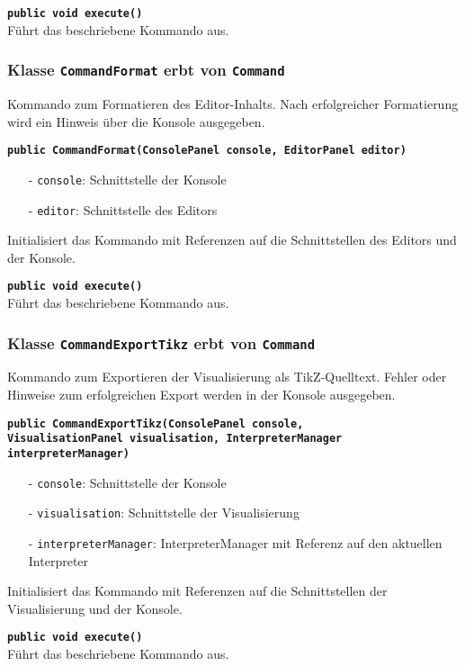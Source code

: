 \documentclass[parskip=full,11pt,twoside]{scrartcl}
\begin{document}
\textbf{\texttt{public void execute()}}\\
Führt das beschriebene Kommando aus.

\subsubsection{Klasse \texttt{CommandFormat} erbt von \texttt{Command}}

Kommando zum Formatieren des Editor-Inhalts. Nach erfolgreicher Formatierung wird ein Hinweis über die Konsole ausgegeben.

\textbf{\texttt{public CommandFormat(ConsolePanel console, EditorPanel editor)}}
\begin{itemize}[noitemsep]
	\item[-] \texttt{console}: Schnittstelle der Konsole
	\item[-] \texttt{editor}: Schnittstelle des Editors
\end{itemize}
Initialisiert das Kommando mit Referenzen auf die Schnittstellen des Editors und der Konsole.

\textbf{\texttt{public void execute()}}\\
Führt das beschriebene Kommando aus.

\subsubsection{Klasse \texttt{CommandExportTikz} erbt von \texttt{Command}}

Kommando zum Exportieren der Visualisierung als TikZ-Quelltext. Fehler oder Hinweise zum erfolgreichen Export werden in der Konsole ausgegeben.

\textbf{\texttt{public CommandExportTikz(ConsolePanel console,\\VisualisationPanel visualisation, InterpreterManager interpreterManager)}}
\begin{itemize}[noitemsep]
	\item[-] \texttt{console}: Schnittstelle der Konsole
	\item[-] \texttt{visualisation}: Schnittstelle der Visualisierung
	\item[-] \texttt{interpreterManager}: InterpreterManager mit Referenz auf den aktuellen Interpreter
\end{itemize}
Initialisiert das Kommando mit Referenzen auf die Schnittstellen der Visualisierung und der Konsole.

\textbf{\texttt{public void execute()}}\\
Führt das beschriebene Kommando aus.
\end{document}
